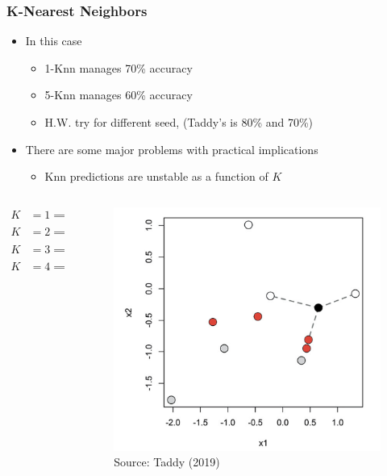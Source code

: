 \documentclass[
  shownotes,
  xcolor={svgnames},
  hyperref={colorlinks,citecolor=DarkBlue,linkcolor=DarkRed,urlcolor=DarkBlue}
  , aspectratio=169]{beamer}
\begin{document}
\begin{frame}[fragile]
\frametitle{K-Nearest Neighbors}
\begin{itemize}
\item In this case
  \begin{itemize}
    \item 1-Knn manages 70\% accuracy
    \item 5-Knn manages 60\% accuracy
    \item H.W. try for different seed, (Taddy's is 80\% and 70\%)
  \end{itemize}
  \item There are some major problems with practical implications
  \begin{itemize}
  \item Knn predictions are unstable as a function of $K$
    \end{itemize}
\end{itemize}
  \begin{columns}[T] %
\begin{column}{.58\textwidth}
\begin{align}
  K&=1 \implies \hat{p}(white)=0 \nonumber \\
  K&=2 \implies \hat{p}(white)=1/2 \nonumber \\
  K&=3 \implies \hat{p}(white)=2/3 \nonumber \\
  K&=4 \implies \hat{p}(white)=1/2 \nonumber 
  \end{align}


\end{column}
\hfill
\begin{column}{.4\textwidth}
\begin{figure}[H] \centering
            \captionsetup{justification=centering}
              \includegraphics[scale=0.1]{figures/knn}
              \\
              \tiny
              Source: Taddy (2019)
 \end{figure}
\end{column}
\end{columns}
  

\end{frame}
\end{document}
